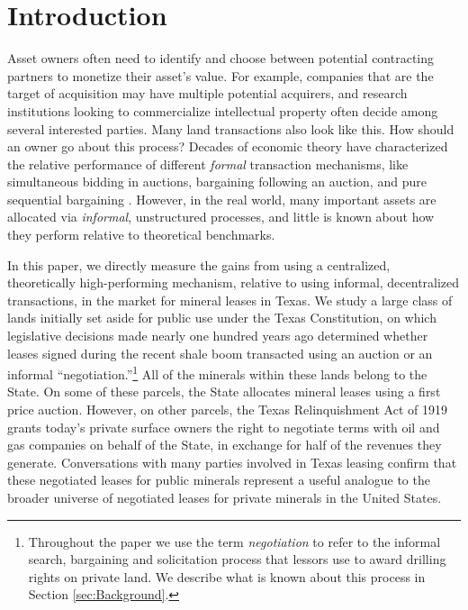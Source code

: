 \documentclass[12pt]{article}
\begin{document}
\newpage

\section{Introduction} \label{sec:Intro}

Asset owners often need to identify and choose between potential contracting partners to monetize their asset's value. For example, companies that are the target of acquisition may have multiple potential acquirers, and research institutions looking to commercialize intellectual property often decide among several interested parties. Many land transactions also look like this. How should an owner go about this process?  Decades of economic theory have characterized the relative performance of different \textit{formal} transaction mechanisms, like simultaneous bidding in auctions, bargaining following an auction, and pure sequential bargaining \citep{bulow_auctions_1996, bulow_why_2009, roberts_when_2013}.  However, in the real world, many important assets are allocated via \textit{informal}, unstructured processes, and little is known about how they perform relative to theoretical benchmarks.

In this paper, we directly measure the gains from using a centralized, theoretically high-performing mechanism, relative to using informal, decentralized transactions, in the market for mineral leases in Texas. We study a large class of lands initially set aside for public use under the Texas Constitution, on which legislative decisions made nearly one hundred years ago determined whether leases signed during the recent shale boom transacted using an auction or an informal ``negotiation.''\footnote{Throughout the paper we use the term \textit{negotiation} to refer to the informal search, bargaining and solicitation process that lessors use to award drilling rights on private land. We describe what is known about this process in Section \ref{sec:Background}.} All of the minerals within these lands belong to the State. On some of these parcels, the State allocates mineral leases using a first price auction. However, on other parcels, the Texas Relinquishment Act of 1919 grants today's private surface owners the right to negotiate terms with oil and gas companies on behalf of the State, in exchange for half of the revenues they generate.  Conversations with many parties involved in Texas leasing confirm that these negotiated leases for public minerals represent a useful analogue to the broader universe of negotiated leases for private minerals in the United States. 
\end{document}
